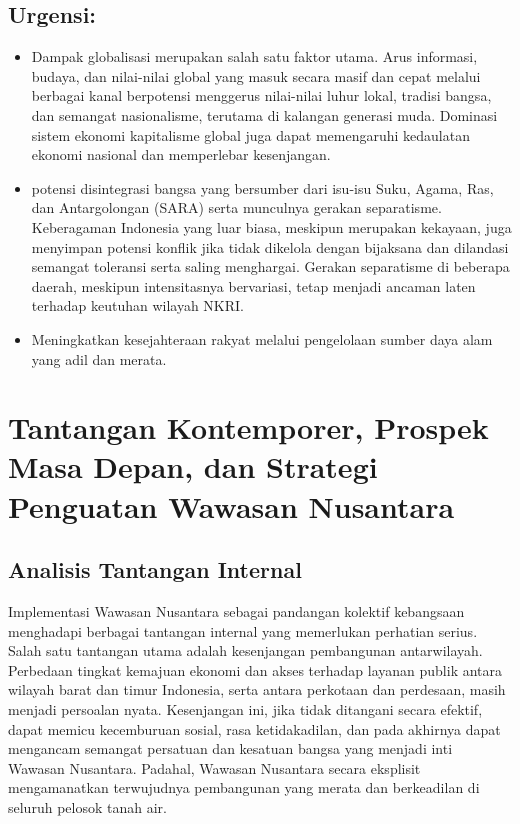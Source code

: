 \documentclass[12pt, a4paper]{article}
\begin{document}
\subsection*{Urgensi:}
\begin{itemize}
    \item Dampak globalisasi merupakan salah satu faktor utama. Arus informasi, budaya, dan nilai-nilai global yang masuk secara masif dan cepat melalui berbagai kanal berpotensi menggerus nilai-nilai luhur lokal, tradisi bangsa, dan semangat nasionalisme, terutama di kalangan generasi muda. Dominasi sistem ekonomi kapitalisme global juga dapat memengaruhi kedaulatan ekonomi nasional dan memperlebar kesenjangan.  
    \item potensi disintegrasi bangsa yang bersumber dari isu-isu Suku, Agama, Ras, dan Antargolongan (SARA) serta munculnya gerakan separatisme. Keberagaman Indonesia yang luar biasa, meskipun merupakan kekayaan, juga menyimpan potensi konflik jika tidak dikelola dengan bijaksana dan dilandasi semangat toleransi serta saling menghargai. Gerakan separatisme di beberapa daerah, meskipun intensitasnya bervariasi, tetap menjadi ancaman laten terhadap keutuhan wilayah NKRI.
    \item Meningkatkan kesejahteraan rakyat melalui pengelolaan sumber daya alam yang adil dan merata.
\end{itemize}


\section{Tantangan Kontemporer, Prospek Masa Depan, dan Strategi Penguatan Wawasan Nusantara}
\subsection*{Analisis Tantangan Internal}

Implementasi Wawasan Nusantara sebagai pandangan kolektif kebangsaan menghadapi berbagai tantangan internal yang memerlukan perhatian serius. Salah satu tantangan utama adalah kesenjangan pembangunan antarwilayah. Perbedaan tingkat kemajuan ekonomi dan akses terhadap layanan publik antara wilayah barat dan timur Indonesia, serta antara perkotaan dan perdesaan, masih menjadi persoalan nyata. Kesenjangan ini, jika tidak ditangani secara efektif, dapat memicu kecemburuan sosial, rasa ketidakadilan, dan pada akhirnya dapat mengancam semangat persatuan dan kesatuan bangsa yang menjadi inti Wawasan Nusantara. Padahal, Wawasan Nusantara secara eksplisit mengamanatkan terwujudnya pembangunan yang merata dan berkeadilan di seluruh pelosok tanah air.  
\end{document}
